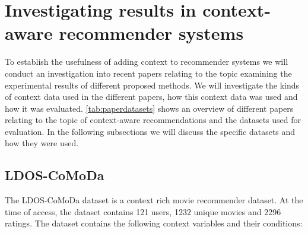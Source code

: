 \section{Investigating results in context-aware recommender systems}
To establish the usefulness of adding context to recommender systems we will conduct an investigation into recent papers relating to the topic examining the experimental results of different proposed methods.
We will investigate the kinds of context data used in the different papers, how this context data was used and how it was evaluated.
\autoref{tab:paperdatasets} shows an overview of different papers relating to the topic of context-aware recommendations and the datasets used for evaluation.
In the following subsections we will discuss the specific datasets and how they were used.

\subsection{LDOS-CoMoDa}
The LDOS-CoMoDa dataset is a context rich movie recommender dataset\cite{comoda}.
At the time of access, the dataset contains 121 users, 1232 unique movies and 2296 ratings.
The dataset contains the following context variables and their conditions:
